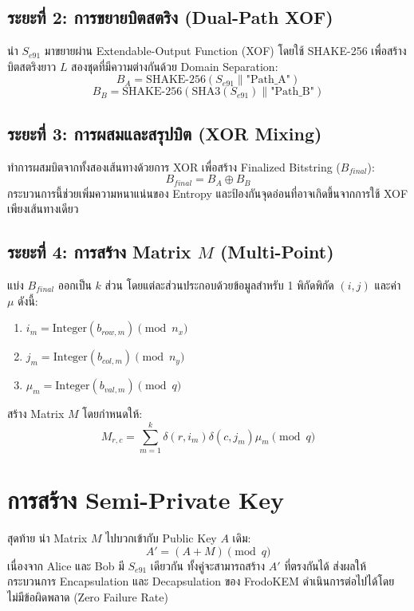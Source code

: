 \documentclass[twocolumn, a4paper]{article}
\begin{document}
	\subsection{ระยะที่ 2: การขยายบิตสตริง (Dual-Path XOF)}
	นำ $S_{e91}$ มาขยายผ่าน Extendable-Output Function (XOF) โดยใช้ SHAKE-256 เพื่อสร้างบิตสตริงยาว $L$ สองชุดที่มีความต่างกันด้วย Domain Separation:
	\begin{equation}
		B_A = \text{SHAKE-256}(S_{e91} \parallel \text{"Path\_A"})
	\end{equation}
	\begin{equation}
		B_B = \text{SHAKE-256}(\text{SHA3}(S_{e91}) \parallel \text{"Path\_B"})
	\end{equation}
	
	\subsection{ระยะที่ 3: การผสมและสรุปบิต (XOR Mixing)}
	ทำการผสมบิตจากทั้งสองเส้นทางด้วยการ XOR เพื่อสร้าง Finalized Bitstring ($B_{final}$):
	\begin{equation}
		B_{final} = B_A \oplus B_B
	\end{equation}
	กระบวนการนี้ช่วยเพิ่มความหนาแน่นของ Entropy และป้องกันจุดอ่อนที่อาจเกิดขึ้นจากการใช้ XOF เพียงเส้นทางเดียว
	
	\subsection{ระยะที่ 4: การสร้าง Matrix $M$ (Multi-Point)}
	แบ่ง $B_{final}$ ออกเป็น $k$ ส่วน โดยแต่ละส่วนประกอบด้วยข้อมูลสำหรับ 1 พิกัดพิกัด $(i, j)$ และค่า $\mu$ ดังนี้:
	\begin{enumerate}
		\item $i_m = \text{Integer}(b_{row, m}) \pmod{n_x}$
		\item $j_m = \text{Integer}(b_{col, m}) \pmod{n_y}$
		\item $\mu_m = \text{Integer}(b_{val, m}) \pmod{q}$
	\end{enumerate}
	สร้าง Matrix $M$ โดยกำหนดให้:
	\begin{equation}
		M_{r, c} = \sum_{m=1}^{k} \delta(r, i_m) \delta(c, j_m) \mu_m \pmod{q}
	\end{equation}
	
	\section{การสร้าง Semi-Private Key}
	สุดท้าย นำ Matrix $M$ ไปบวกเข้ากับ Public Key $A$ เดิม:
	\begin{equation}
		A' = (A + M) \pmod{q}
	\end{equation}
	เนื่องจาก Alice และ Bob มี $S_{e91}$ เดียวกัน ทั้งคู่จะสามารถสร้าง $A'$ ที่ตรงกันได้ ส่งผลให้กระบวนการ Encapsulation และ Decapsulation ของ FrodoKEM ดำเนินการต่อไปได้โดยไม่มีข้อผิดพลาด (Zero Failure Rate)
	
\end{document}
